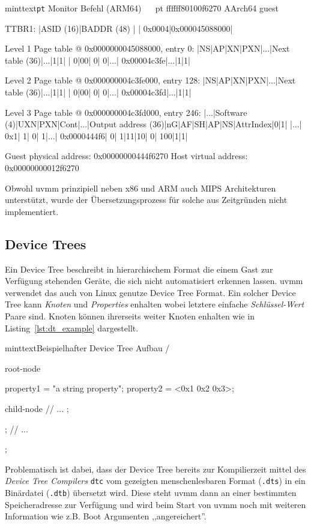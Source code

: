 \begin{mintlisting}[label=lst:pt_example_arm64]{minttext}{\texttt{pt} Monitor Befehl (ARM64)}
~\color{red}{monitor>}~ pt ffffff80100f6270
AArch64 guest

TTBR1:
|ASID (16)|BADDR (48)    |
|   0x0004|0x000045088000|

Level 1 Page table @ 0x0000000045088000, entry 0:
|NS|AP|XN|PXN|...|Next table (36)|...|1|1|
| 0|00| 0|  0|...|    0x00004c3fe|...|1|1|

Level 2 Page table @ 0x000000004c3fe000, entry 128:
|NS|AP|XN|PXN|...|Next table (36)|...|1|1|
| 0|00| 0|  0|...|    0x00004c3fd|...|1|1|

Level 3 Page table @ 0x000000004c3fd000, entry 246:
|...|Software (4)|UXN|PXN|Cont|...|Output address (36)|nG|AF|SH|AP|NS|AttrIndex|0|1|
|...|         0x1|  1|  0|   1|...|        0x0000444f6| 0| 1|11|10| 0|      100|1|1|

Guest physical address: 0x00000000444f6270
Host virtual address: 0x00000000012f6270
\end{mintlisting}

Obwohl uvmm prinzipiell neben x86 und ARM auch MIPS Architekturen unterstützt,
wurde der Übersetzungsprozess für solche aus Zeitgründen nicht implementiert.

\subsection{Device Trees}

Ein Device Tree beschreibt in hierarchischem Format die einem Gast zur
Verfügung stehenden Geräte, die sich nicht automatisiert erkennen lassen.
uvmm verwendet das auch von Linux genutze Device Tree Format. Ein solcher
Device Tree kann \textit{Knoten} und \textit{Properties} enhalten wobei
letztere einfache \textit{Schlüssel-Wert} Paare sind. Knoten können ihrerseits
weiter Knoten enhalten wie in Listing~\ref{lst:dt_example} dargestellt.

\begin{mintlisting}[label=lst:dt_example]{minttext}{Beispielhafter Device Tree Aufbau}
/ {
    root-node {
        property1 = "a string property";
        property2 = <0x1 0x2 0x3>;

        child-node {
          // ...
        };
    };
    // ...
};
\end{mintlisting}

Problematisch ist dabei, dass der Device Tree bereits zur Kompilierzeit mittel
des \textit{Device Tree Compilers} \texttt{dtc} vom gezeigten menschenlesbaren
Format (\texttt{.dts}) in ein Binärdatei (\texttt{.dtb}) übersetzt wird. Diese
steht uvmm dann an einer bestimmten Speicheradresse zur Verfügung und wird beim
Start von uvmm noch mit weiteren Information wie z.B. Boot Argumenten
,,angereichert''.

